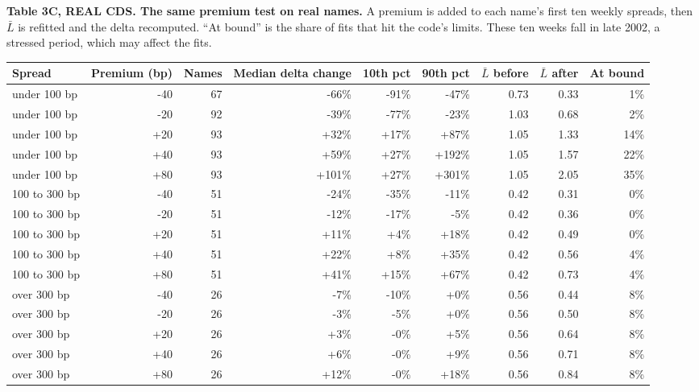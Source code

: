 \documentclass[10pt,a4paper]{article}
\begin{document}
\textbf{Table 3C, REAL CDS. The same premium test on real names.} A premium is added to each name's first ten weekly spreads, then $\bar L$ is refitted and the delta recomputed. ``At bound'' is the share of fits that hit the code's limits. These ten weeks fall in late 2002, a stressed period, which may affect the fits.
{\small
\begin{center}\begin{tabular}{lrrrrrrrr}\toprule
Spread & Premium (bp) & Names & Median delta change & 10th pct & 90th pct & $\bar L$ before & $\bar L$ after & At bound \\ \midrule
under 100 bp & -40 & 67 & -66\% & -91\% & -47\% & 0.73 & 0.33 & 1\% \\
under 100 bp & -20 & 92 & -39\% & -77\% & -23\% & 1.03 & 0.68 & 2\% \\
under 100 bp & +20 & 93 & +32\% & +17\% & +87\% & 1.05 & 1.33 & 14\% \\
under 100 bp & +40 & 93 & +59\% & +27\% & +192\% & 1.05 & 1.57 & 22\% \\
under 100 bp & +80 & 93 & +101\% & +27\% & +301\% & 1.05 & 2.05 & 35\% \\
100 to 300 bp & -40 & 51 & -24\% & -35\% & -11\% & 0.42 & 0.31 & 0\% \\
100 to 300 bp & -20 & 51 & -12\% & -17\% & -5\% & 0.42 & 0.36 & 0\% \\
100 to 300 bp & +20 & 51 & +11\% & +4\% & +18\% & 0.42 & 0.49 & 0\% \\
100 to 300 bp & +40 & 51 & +22\% & +8\% & +35\% & 0.42 & 0.56 & 4\% \\
100 to 300 bp & +80 & 51 & +41\% & +15\% & +67\% & 0.42 & 0.73 & 4\% \\
over 300 bp & -40 & 26 & -7\% & -10\% & +0\% & 0.56 & 0.44 & 8\% \\
over 300 bp & -20 & 26 & -3\% & -5\% & +0\% & 0.56 & 0.50 & 8\% \\
over 300 bp & +20 & 26 & +3\% & -0\% & +5\% & 0.56 & 0.64 & 8\% \\
over 300 bp & +40 & 26 & +6\% & -0\% & +9\% & 0.56 & 0.71 & 8\% \\
over 300 bp & +80 & 26 & +12\% & -0\% & +18\% & 0.56 & 0.84 & 8\% \\
\bottomrule\end{tabular}\end{center}}
\end{document}
